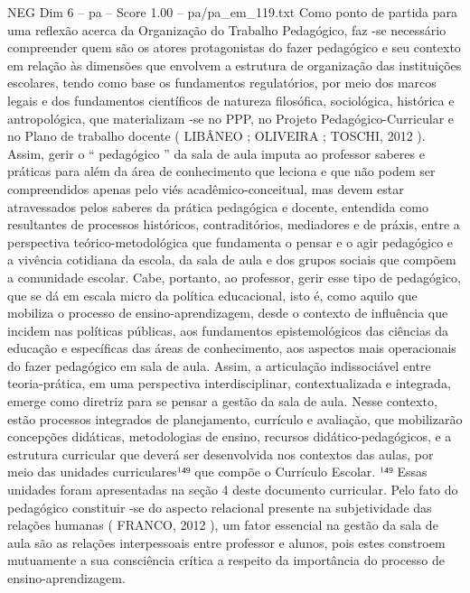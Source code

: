 \begin{textsample}{NEG Dim 6 – pa – Score 1.00 – pa/pa\_em\_119.txt}  \label{ex:f6_neg_222}
Como ponto de partida para uma reflexão acerca da Organização do Trabalho Pedagógico, faz -se necessário compreender quem são os atores protagonistas do fazer pedagógico e seu contexto em relação às dimensões que envolvem a estrutura de organização das instituições escolares, tendo como base os fundamentos regulatórios, por meio dos marcos legais e dos fundamentos científicos de natureza filosófica, sociológica, histórica e antropológica, que materializam -se no PPP, no Projeto Pedagógico-Curricular e no Plano de trabalho docente ( LIBÂNEO ; OLIVEIRA ; TOSCHI, 2012 ).
Assim, gerir o “ pedagógico ” da sala de aula imputa ao professor saberes e práticas para além da área de conhecimento que leciona e que não podem ser compreendidos apenas pelo viés acadêmico-conceitual, mas devem estar atravessados pelos saberes da prática pedagógica e docente, entendida como resultantes de processos históricos, contraditórios, mediadores e de práxis, entre a perspectiva teórico-metodológica que fundamenta o pensar e o agir pedagógico e a vivência cotidiana da escola, da sala de aula e dos grupos sociais que compõem a comunidade escolar.
Cabe, portanto, ao professor, gerir esse tipo de pedagógico, que se dá em escala micro da política educacional, isto é, como aquilo que mobiliza o processo de ensino-aprendizagem, desde o contexto de influência que incidem nas políticas públicas, aos fundamentos epistemológicos das ciências da educação e específicas das áreas de conhecimento, aos aspectos mais operacionais do fazer pedagógico em sala de aula.
Assim, a articulação indissociável entre teoria-prática, em uma perspectiva interdisciplinar, contextualizada e integrada, emerge como diretriz para se pensar a gestão da sala de aula.
Nesse contexto, estão processos integrados de planejamento, currículo e avaliação, que mobilizarão concepções didáticas, metodologias de ensino, recursos didático-pedagógicos, e a estrutura curricular que deverá ser desenvolvida nos contextos das aulas, por meio das unidades curriculares¹⁴⁹ que compõe o Currículo Escolar. ¹⁴⁹ Essas unidades foram apresentadas na seção 4 deste documento curricular.
Pelo fato do pedagógico constituir -se do aspecto relacional presente na subjetividade das relações humanas ( FRANCO, 2012 ), um fator essencial na gestão da sala de aula são as relações interpessoais entre professor e alunos, pois estes constroem mutuamente a sua consciência crítica a respeito da importância do processo de ensino-aprendizagem.

\end{textsample}
